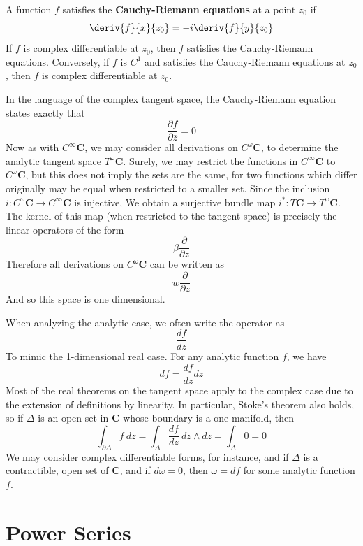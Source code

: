 \begin{theorem}
    A function $f$ satisfies the {\bf Cauchy-Riemann equations} at a point $z_0$ if
    \[ \deriv{f}{x}{z_0} = -i \deriv{f}{y}{z_0} \]
    If $f$ is complex differentiable at $z_0$, then $f$ satisfies the Cauchy-Riemann equations. Conversely, if $f$ is $C^1$ and satisfies the Cauchy-Riemann equations at $z_0$, then $f$ is complex differentiable at $z_0$.
\end{theorem}

In the language of the complex tangent space, the Cauchy-Riemann equation states exactly that
%
\[ \frac{\partial f}{\partial \overline{z}} = 0 \]
%
Now as with $C^\infty \mathbf{C}$, we may consider all derivations on $C^\omega \mathbf{C}$, to determine the analytic tangent space $T^\omega \mathbf{C}$. Surely, we may restrict the functions in $C^\infty \mathbf{C}$ to $C^\omega \mathbf{C}$, but this does not imply the sets are the same, for two functions which differ originally may be equal when restricted to a smaller set. Since the inclusion $i:C^\omega \mathbf{C} \to C^\infty \mathbf{C}$ is injective, We obtain a surjective bundle map $i^*: T \mathbf{C} \to T^\omega \mathbf{C}$. The kernel of this map (when restricted to the tangent space) is precisely the linear operators of the form
%
\[ \beta \frac{\partial}{\partial \overline{z}} \]
%
Therefore all derivations on $C^\omega \mathbf{C}$ can be written as
%
\[ w \frac{\partial}{\partial z} \]
%
And so this space is one dimensional.

When analyzing the analytic case, we often write the operator as
%
\[ \frac{df}{dz} \]
%
To mimic the 1-dimensional real case. For any analytic function $f$, we have
%
\[ df = \frac{df}{dz} dz \]
%
Most of the real theorems on the tangent space apply to the complex case due to the extension of definitions by linearity. In particular, Stoke's theorem also holds, so if $\Delta$ is an open set in $\mathbf{C}$ whose boundary is a one-manifold, then
%
\[ \int_{\partial \Delta} f\ dz = \int_\Delta \frac{df}{dz}\ dz \wedge dz = \int_\Delta 0 = 0 \]
%
We may consider complex differentiable forms, for instance, and if $\Delta$ is a contractible, open set of $\mathbf{C}$, and if $d \omega = 0$, then $\omega = df$ for some analytic function $f$.



\section{Power Series}


